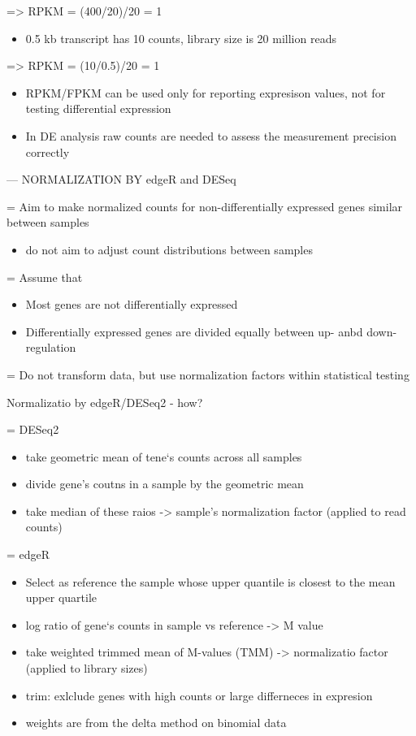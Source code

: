 \documentclass[
]{book}
\providecommand{\tightlist}{%
  \setlength{\itemsep}{0pt}\setlength{\parskip}{0pt}}
\begin{document}
=\textgreater{} RPKM = (400/20)/20 = 1

\begin{itemize}
\tightlist
\item
  0.5 kb transcript has 10 counts, library size is 20 million reads
\end{itemize}

=\textgreater{} RPKM = (10/0.5)/20 = 1

\begin{itemize}
\item
  RPKM/FPKM can be used only for reporting expresison values, not for testing differential expression
\item
  In DE analysis raw counts are needed to assess the measurement precision correctly
\end{itemize}

--- NORMALIZATION BY edgeR and DESeq

= Aim to make normalized counts for non-differentially expressed genes similar between samples

\begin{itemize}
\tightlist
\item
  do not aim to adjust count distributions between samples
\end{itemize}

= Assume that

\begin{itemize}
\item
  Most genes are not differentially expressed
\item
  Differentially expressed genes are divided equally between up- anbd down-regulation
\end{itemize}

= Do not transform data, but use normalization factors within statistical testing

Normalizatio by edgeR/DESeq2 - how?

= DESeq2

\begin{itemize}
\item
  take geometric mean of tene`s counts across all samples
\item
  divide gene's coutns in a sample by the geometric mean
\item
  take median of these raios -\textgreater{} sample's normalization factor (applied to read counts)
\end{itemize}

= edgeR

\begin{itemize}
\item
  Select as reference the sample whose upper quantile is closest to the mean upper quartile
\item
  log ratio of gene`s counts in sample vs reference -\textgreater{} M value
\item
  take weighted trimmed mean of M-values (TMM) -\textgreater{} normalizatio factor (applied to library sizes)
\item
  trim: exlclude genes with high counts or large differneces in expresion
\item
  weights are from the delta method on binomial data
\end{itemize}
\end{document}
